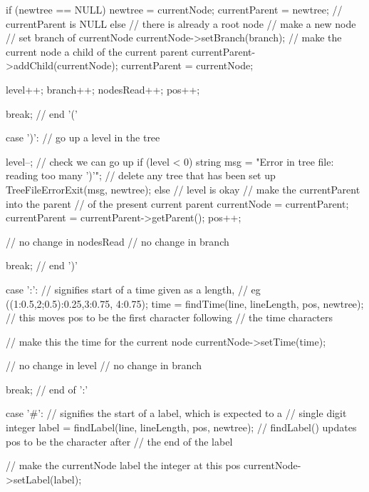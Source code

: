 \begin{DoxyCode}
{{{        if (newtree == NULL)
        {
          newtree = currentNode;
          currentParent = newtree;
          // currentParent is NULL
        }
        else        // there is already a root node
        {
          // make a new node
                    // set branch of currentNode
          currentNode->setBranch(branch);
                    // make the current node a child of the current parent
          currentParent->addChild(currentNode);
          currentParent = currentNode;
        }

        level++;
        branch++;
        nodesRead++;
        pos++;

        break;      // end '('

      case ')':     // go up a level in the tree

        level--;
                    // check we can go up
        if (level < 0)
        {
          string msg = "Error in tree file: reading too many ')'";
          // delete any tree that has been set up
          TreeFileErrorExit(msg, newtree);
        }
        else        // level is okay
        {
          // make the currentParent into the parent 
          // of the present current parent
          currentNode = currentParent;
          currentParent = currentParent->getParent();
          pos++;
        }

        // no change in nodesRead
        // no change in branch

        break;      // end ')'

      case ':':     // signifies start of a time given as a length, 
                    // eg ((1:0.5,2;0.5):0.25,3:0.75, 4:0.75);
        time = findTime(line, lineLength, pos, newtree);
        // this moves pos to be the first character following 
        // the time characters

        // make this the time for the current node
        currentNode->setTime(time);

        // no change in level
        // no change in branch

        break;      // end of ':'

      case '#':     // signifies the start of a label, which is expected to a 
                    // single digit integer
        label = findLabel(line, lineLength, pos, newtree);
        // findLabel() updates pos to be the character after 
        // the end of the label

                    // make the currentNode label the integer at this pos
        currentNode->setLabel(label);

}}}
\end{DoxyCode}
